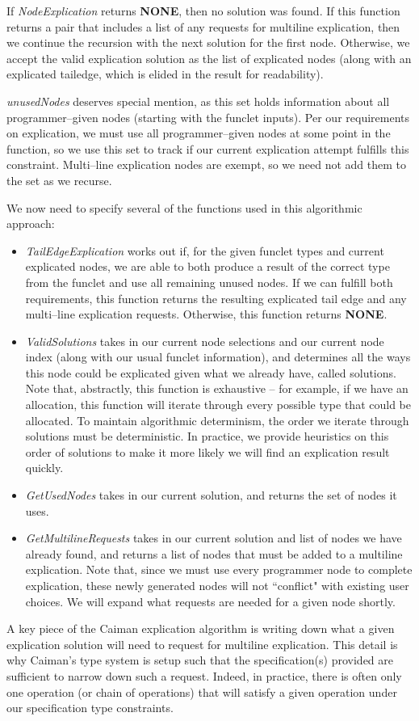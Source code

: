 If \textit{NodeExplication} returns \textbf{NONE}, then no solution was found.  If this function returns a pair that includes a list of any requests for multiline explication, then we continue the recursion with the next solution for the first node.  Otherwise, we accept the valid explication solution as the list of explicated nodes (along with an explicated tailedge, which is elided in the result for readability).

\textit{unusedNodes} deserves special mention, as this set holds information about all programmer--given nodes (starting with the funclet inputs).  Per our requirements on explication, we must use all programmer--given nodes at some point in the function, so we use this set to track if our current explication attempt fulfills this constraint.  Multi--line explication nodes are exempt, so we need not add them to the set as we recurse.

We now need to specify several of the functions used in this algorithmic approach:
%
\begin{itemize}
\item \textit{TailEdgeExplication} works out if, for the given funclet types and current explicated nodes, we are able to both produce a result of the correct type from the funclet and use all remaining unused nodes.  If we can fulfill both requirements, this function returns the resulting explicated tail edge and any multi--line explication requests.  Otherwise, this function returns \textbf{NONE}.
\item \textit{ValidSolutions} takes in our current node selections and our current node index (along with our usual funclet information), and determines all the ways this node could be explicated given what we already have, called solutions.  Note that, abstractly, this function is exhaustive -- for example, if we have an allocation, this function will iterate through every possible type that could be allocated.  To maintain algorithmic determinism, the order we iterate through solutions must be deterministic.  In practice, we provide heuristics on this order of solutions to make it more likely we will find an explication result quickly.
\item \textit{GetUsedNodes} takes in our current solution, and returns the set of nodes it uses.
\item \textit{GetMultilineRequests} takes in our current solution and list of nodes we have already found, and returns a list of nodes that must be added to a multiline explication.  Note that, since we must use every programmer node to complete explication, these newly generated nodes will not ``conflict" with existing user choices.  We will expand what requests are needed for a given node shortly.
\end{itemize}
%
A key piece of the Caiman explication algorithm is writing down what a given explication solution will need to request for multiline explication.  This detail is why Caiman's type system is setup such that the specification(s) provided are sufficient to narrow down such a request.  Indeed, in practice, there is often only one operation (or chain of operations) that will satisfy a given operation under our specification type constraints.

